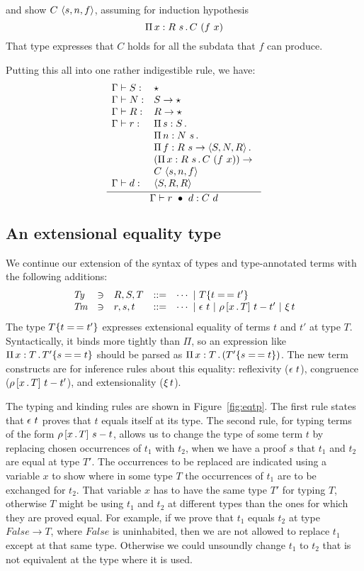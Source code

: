 \documentclass{article}
\begin{document}
\noindent and show $C\ \ctor{s}{n}{f}$, assuming for induction hypothesis
\[
\Pia{x}{R\ s}{C\ (f\ x)}
\]
\noindent That type expresses that $C$ holds for all the subdata that $f$ can produce.

Putting this all into one rather indigestible rule, we have:
\[
\infer{\Gamma \vdash \wrec{r}{d} : C\ d}
      {
        \begin{array}{lll}
\Gamma \vdash S : & \star \\
\Gamma \vdash N : & S \to \star \\
\Gamma \vdash R : & R \to \star \\          
\Gamma \vdash r : & \Pia{s}{S}{\ }  \\
\ &  \Pia{n}{N\ s}{\ }  \\
\ &  \Pia{f}{R\ s \to \w{S}{N}{R}}{\ }  \\
\ &  (\Pia{x}{R\ s}{C\ (f\ x)}) \to  \\
\ &  C\ \ctor{s}{n}{f} \\
\Gamma\vdash d : & \w{S}{R}{R}
        \end{array} }
      \]



\subsection{An extensional equality type}

We continue our extension of the syntax of types and type-annotated terms with the following additions:
\[
\begin{array}{lllll}
  \textit{Ty} & \ni & R,S,T & ::= & \cdots\ |\ \eqtm{t}{T}{t'} \\
  \textit{Tm} & \ni & r,s,t & ::= & \cdots\ |\ \rfl{t}\ |\ \cng{x}{T}{t}{t'}\ |\ \ext{t}
\end{array}
\]
\noindent The type $\eqtm{t}{T}{t'}$ expresses extensional equality of
terms $t$ and $t'$ at type $T$.  Syntactically, it binds more tightly
than $\Pi$, so an expression like $\Pia{x}{T}{\eqtm{s}{T'}{t}}$ should
be parsed as $\Pia{x}{T}{(\eqtm{s}{T'}{t})}$.  The new term constructs
are for inference rules about this equality: reflexivity ($\rfl{t}$),
congruence ($\cng{x}{T}{t}{t'}$), and extensionality ($\ext{t}$).  

The typing and kinding rules are shown in
Figure~\ref{fig:eqtp}.  The first rule states that $\rfl{t}$ proves
that $t$ equals itself at its type.  The second rule, for typing
terms of the form $\cng{x}{T}{s}{t}$, allows us
to change the type of some term $t$ by replacing chosen occurrences
of $t_1$ with $t_2$, when we have a proof $s$ that $t_1$ and $t_2$
are equal at type $T'$.  The occurrences to be replaced are indicated
using a variable $x$ to show where in some type $T$ the occurrences
of $t_1$ are to be exchanged for $t_2$.  That variable $x$ has to
have the same type $T'$ for typing $T$, otherwise $T$ might be using
$t_1$ and $t_2$ at different types than the ones for which they are
proved equal.  For example, if we prove that $t_1$ equals $t_2$ at type
$\textit{False} \to T$, where $\textit{False}$ is uninhabited, then
we are not allowed to replace $t_1$ except at that same type.  Otherwise
we could unsoundly change $t_1$ to $t_2$ that is not equivalent at the
type where it is used.
\end{document}
